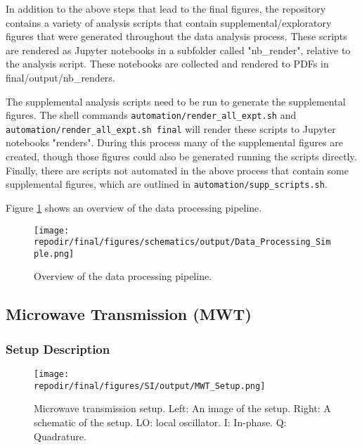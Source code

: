 In addition to the above steps that lead to the final figures, the repository contains a variety of analysis scripts that contain supplemental/exploratory figures that were generated throughout the data analysis process. These scripts are rendered as Jupyter notebooks in a subfolder called "nb\_render", relative to the analysis script. These notebooks are collected and rendered to PDFs in final/output/nb\_renders. 

The supplemental analysis scripts need to be run to generate the supplemental figures. The shell commands \texttt{automation/render\_all\_expt.sh} and \texttt{automation/render\_all\_expt.sh final} will render these scripts to Jupyter notebooks "renders". During this process many of the supplemental figures are created, though those figures could also be generated running the scripts directly. Finally, there are scripts not automated in the above process that contain some supplemental figures, which are outlined in \texttt{automation/supp\_scripts.sh}. 

Figure \ref{fig:SI_Data_Processing_Simple} shows an overview of the data processing pipeline.

\begin{figure}[H]
\centering
\texttt{[image: \\repodir/final/figures/schematics/output/Data\_Processing\_Simple.png]}
\caption{Overview of the data processing pipeline.}
\label{fig:SI_Data_Processing_Simple}
\end{figure}


\clearpage
\subsection{Microwave Transmission (MWT)}


\subsubsection{Setup Description}
\begin{figure}[]
\centering
\texttt{[image: \\repodir/final/figures/SI/output/MWT\_Setup.png]}
\caption{Microwave transmission setup. Left: An image of the setup. Right: A schematic of the setup. LO: local oscillator. I: In-phase. Q: Quadrature.  }
\label{fig:SI_MWT_Setup}
\end{figure}

